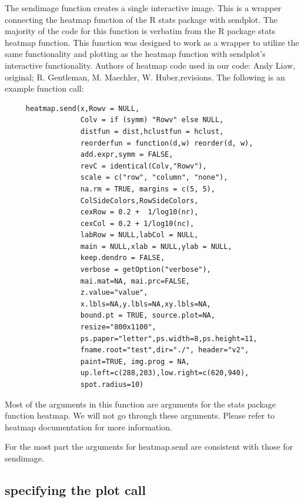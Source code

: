 \documentclass[]{article}
\begin{document}
The sendimage function creates a single interactive image. This is a wrapper connecting the heatmap function of the R stats package with sendplot. The majority of the code for this function is verbatim from the R package stats heatmap function. This function was designed to work as a wrapper to utilize the same functionality and plotting as the heatmap function with sendplot's interactive functionality. Authors of heatmap code used in our code: Andy Liaw, original; R. Gentleman, M. Maechler, W. Huber,revisions. The following is an example function call: 

\begin{verbatim}
     heatmap.send(x,Rowv = NULL,
                  Colv = if (symm) "Rowv" else NULL, 
                  distfun = dist,hclustfun = hclust,
                  reorderfun = function(d,w) reorder(d, w),
                  add.expr,symm = FALSE,
                  revC = identical(Colv,"Rowv"),
                  scale = c("row", "column", "none"),
                  na.rm = TRUE, margins = c(5, 5),
                  ColSideColors,RowSideColors,
                  cexRow = 0.2 +  1/log10(nr),
                  cexCol = 0.2 + 1/log10(nc),
                  labRow = NULL,labCol = NULL,
                  main = NULL,xlab = NULL,ylab = NULL,
                  keep.dendro = FALSE, 
                  verbose = getOption("verbose"),
                  mai.mat=NA, mai.prc=FALSE,
                  z.value="value",
                  x.lbls=NA,y.lbls=NA,xy.lbls=NA,
                  bound.pt = TRUE, source.plot=NA,
                  resize="800x1100",
                  ps.paper="letter",ps.width=8,ps.height=11,
                  fname.root="test",dir="./", header="v2",
                  paint=TRUE, img.prog = NA,
                  up.left=c(288,203),low.right=c(620,940),
                  spot.radius=10) 
\end{verbatim}

 Most of the arguments in this function are arguments for the stats package function heatmap. We will not go through these arguments. Please refer to heatmap documentation for more information. \newline

For the most part the arguments for heatmap.send are consistent with those for sendimage.


\subsection{specifying the plot call}
\end{document}
